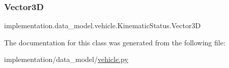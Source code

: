 \subsubsection{\texorpdfstring{Vector3D}{Vector3D}}
{\footnotesize\ttfamily implementation.\+data\+\_\+model.\+vehicle.\+Kinematic\+Status.\+Vector3D\hspace{0.3cm}{\ttfamily [static]}}



The documentation for this class was generated from the following file\+:\begin{DoxyCompactItemize}
\item 
implementation/data\+\_\+model/\hyperlink{vehicle_8py}{vehicle.\+py}\end{DoxyCompactItemize}
